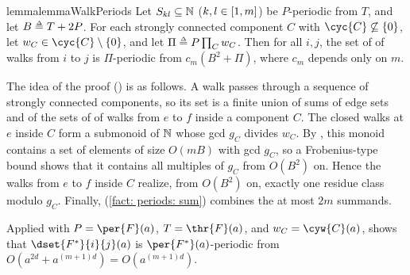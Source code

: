 \begin{restatable}{lemma}{lemmaWalkPeriods}\label{lemma: walk periods}
    Let $S_{kl} \subseteq \mathbb{N}$ ($k, l \in [1, m]$) be $P$-periodic from $T$, and let $B \defeq T + 2P$.
    For each strongly connected component $C$ with $\cyc{C} \not\subseteq \set{0}$, let $w_C \in \cyc{C} \setminus \set{0}$, and let $\Pi \defeq P \prod_C w_C$.
    Then for all $i, j$, the set of  of walks from $i$ to $j$ is $\Pi$-periodic from $c_m (B^{2} + \Pi)$, where $c_m$ depends only on $m$.
\end{restatable}
The idea of the proof () is as follows.
A walk passes through a sequence of strongly connected components, so its  set is a finite union of sums of edge sets and of the sets of  of walks from $e$ to $f$ inside a component $C$.
The closed walks at $e$ inside $C$ form a submonoid of $\mathbb{N}$ whose gcd $g_C$ divides $w_C$.
By , this monoid contains a set of elements of size $O(m B)$ with gcd $g_C$, so a Frobenius-type bound shows that it contains all multiples of $g_C$ from $O(B^2)$ on.
Hence the walks from $e$ to $f$ inside $C$ realize, from $O(B^2)$ on, exactly one residue class modulo $g_C$.
Finally, (\ref{fact: periods: sum}) combines the at most $2m$ summands.

Applied with $P = \per{F}(a)$, $T = \thr{F}(a)$, and $w_C = \cyw{C}(a)$,  shows that $\dset{F^{*}}{i}{j}(a)$ is $\per{F^{*}}(a)$-periodic from $O(a^{2d} + a^{(m+1) d}) = O(a^{(m+1) d})$.

